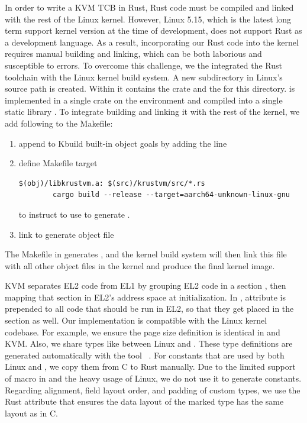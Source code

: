 In order to write a KVM TCB in Rust, Rust code must be compiled and linked with
the rest of the Linux kernel.
However, Linux 5.15, which is the latest long term support kernel version at
the time of \rustsec{} development, does not support Rust as a development
language. As a result, incorporating our Rust code into the kernel requires
manual building and linking, which can be both laborious and susceptible to
errors.
To overcome this challenge, we the integrated the Rust toolchain with the Linux
kernel build system. A new subdirectory in Linux's source path
 is created. Within it contains the \rustcore{} crate
and the  for this directory.
\rustcore{} is implemented in a single crate on the  environment
and compiled into a single static library .
To integrate building  and linking it with the
rest of the kernel, we add following to the Makefile:
\begin{enumerate}
\item{append  to Kbuild built-in object goals  by adding the line }
\item{define Makefile target
\begin{listing}[hbtp]
    \begin{verbatim}
$(obj)/libkrustvm.a: $(src)/krustvm/src/*.rs
        cargo build --release --target=aarch64-unknown-linux-gnu
    \end{verbatim}
    \label{lst:Makefile}
    \vspace{-1.2cm}
\end{listing}
to instruct  to use  to generate .
}
\item{link  to generate object file }
\end{enumerate}
The Makefile in  generates ,
and the kernel build system will then link this file with all other object
files in the kernel and produce the final kernel image.

KVM separates EL2 code from EL1 by grouping EL2 code in a section
, then mapping that section in EL2's address space at
initialization.
In \rustcore{}, attribute \code{\#[link\_section = ".hyp.text"]} is prepended
to all code that should be run in EL2, so that they get placed in the
 section as well.
Our implementation is compatible with the Linux kernel codebase. For example, we
ensure the page size definition is identical in \rustcore{} and KVM.
Also, we share types like  between Linux and \rustcore{}.
These type definitions are generated automatically
with the tool ~\cite{bindgen}.
For constants that are used by both Linux and \rustcore{},
we copy them from C to Rust manually.
Due to the limited support of macro in 
and the heavy usage of Linux,
we do not use it to generate constants.
Regarding alignment, field layout order, and padding of custom types,
we use the Rust attribute \code{\#[repr\-(C)]}
that ensures the data layout of the marked type has the same layout as in C.

